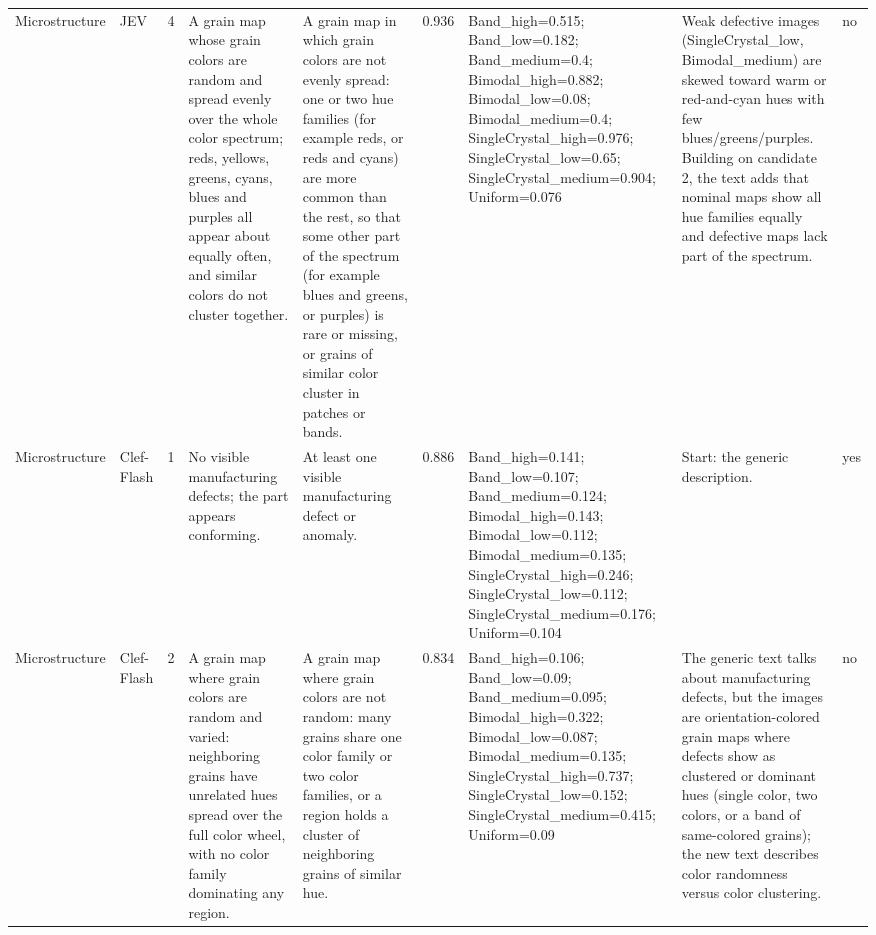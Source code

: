 \begin{table}
\begin{tabular}[t]{llrllrlll}
Microstructure & JEV & 4 & A grain map whose grain colors are random and spread evenly over the whole color spectrum; reds, yellows, greens, cyans, blues and purples all appear about equally often, and similar colors do not cluster together. & A grain map in which grain colors are not evenly spread: one or two hue families (for example reds, or reds and cyans) are more common than the rest, so that some other part of the spectrum (for example blues and greens, or purples) is rare or missing, or grains of similar color cluster in patches or bands. & 0.936 & Band\_high=0.515; Band\_low=0.182; Band\_medium=0.4; Bimodal\_high=0.882; Bimodal\_low=0.08; Bimodal\_medium=0.4; SingleCrystal\_high=0.976; SingleCrystal\_low=0.65; SingleCrystal\_medium=0.904; Uniform=0.076 & Weak defective images (SingleCrystal\_low, Bimodal\_medium) are skewed toward warm or red-and-cyan hues with few blues/greens/purples. Building on candidate 2, the text adds that nominal maps show all hue families equally and defective maps lack part of the spectrum. & no\\
Microstructure & Clef-Flash & 1 & No visible manufacturing defects; the part appears conforming. & At least one visible manufacturing defect or anomaly. & 0.886 & Band\_high=0.141; Band\_low=0.107; Band\_medium=0.124; Bimodal\_high=0.143; Bimodal\_low=0.112; Bimodal\_medium=0.135; SingleCrystal\_high=0.246; SingleCrystal\_low=0.112; SingleCrystal\_medium=0.176; Uniform=0.104 & Start: the generic description. & yes\\
Microstructure & Clef-Flash & 2 & A grain map where grain colors are random and varied: neighboring grains have unrelated hues spread over the full color wheel, with no color family dominating any region. & A grain map where grain colors are not random: many grains share one color family or two color families, or a region holds a cluster of neighboring grains of similar hue. & 0.834 & Band\_high=0.106; Band\_low=0.09; Band\_medium=0.095; Bimodal\_high=0.322; Bimodal\_low=0.087; Bimodal\_medium=0.135; SingleCrystal\_high=0.737; SingleCrystal\_low=0.152; SingleCrystal\_medium=0.415; Uniform=0.09 & The generic text talks about manufacturing defects, but the images are orientation-colored grain maps where defects show as clustered or dominant hues (single color, two colors, or a band of same-colored grains); the new text describes color randomness versus color clustering. & no\\

\end{tabular}
\end{table}
